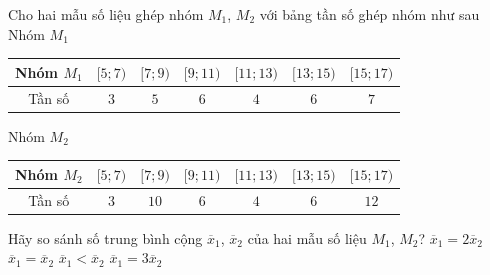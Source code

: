 \begin{ex}%
	Cho hai mẫu số liệu ghép nhóm $M_1$, $M_2$ với bảng tần số ghép nhóm như sau\\
	Nhóm $M_1$
	\begin{center}
		\begin{tabular}{|c|c|c|c|c|c|c|}
			\hline
			Nhóm $M_1$ & $[5;7)$ & $[7;9)$ & $[9;11)$ & $[11;13)$ & $[13;15)$ & $[15;17)$ \\
			\hline
			Tần số & $3$ & $5$ & $6$ & $4$ & $6$ & $7$ \\
			\hline
		\end{tabular}
	\end{center}
	Nhóm $M_2$
	\begin{center}
		\begin{tabular}{|c|c|c|c|c|c|c|}
			\hline
			Nhóm $M_2$ & $[5;7)$ & $[7;9)$ & $[9;11)$ & $[11;13)$ & $[13;15)$ & $[15;17)$ \\
			\hline
			Tần số & $3$ & $10$ & $6$ & $4$ & $6$ & $12$ \\
			\hline
		\end{tabular}
	\end{center}
	Hãy so sánh số trung bình cộng $\overline{x}_1$, $\overline{x}_2$ của hai mẫu số liệu $M_1$, $M_2$?
	\choice
	{$\overline{x}_1=2\overline{x}_2$}
	{$\overline{x}_1=\overline{x}_2$}
	{\True $\overline{x}_1<\overline{x}_2$}
	{$\overline{x}_1=3\overline{x}_2$}
\end{ex}

